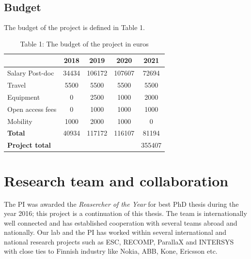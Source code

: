 \documentclass{article}
\begin{document}
\subsection{Budget}
The budget of the project is defined in Table 1.

\begin{table}
\vspace{-3.2cm}
\small
\begin{tabular}{ | l | c | c |c |c |}
\hline
& {\textbf{2018}} & {\textbf{2019}} & {\textbf{2020}} & {\textbf{2021}} \\ \hline
{Salary Post-doc} 	& 34434 & 106172 & 107607 & 72694 \\ \hline
{Travel} 			& 5500 	& 5500 	& 5500 	& 5500  \\ \hline
{Equipment} 		& 0 	& 2500 	& 1000 	& 2000  \\ \hline
{Open access fees} 	& 0 	& 1000 	& 1000 	& 1000  \\ \hline
{Mobility} 			& 1000 	& 2000 	& 1000 	& 0  \\ \hline
{\textbf{Total}} 	& 40934 & 117172	& 116107 	& 81194  \\ \hline
{\textbf{Project total}} 	&  & 	&  	& 355407  \\ \hline
\end{tabular}
\caption*{Table 1: The budget of the project in euros}
\label{tab:budget}
\vspace{-0.5cm}
\end{table}


\section{Research team and collaboration}
The PI was awarded the \textit{Reasercher of the Year} for best PhD thesis during the year 2016; this project is a continuation of this thesis.
The team is internationally well connected and has established cooperation with several teams abroad and nationally. 
Our lab and the PI has worked within several international and national research projects such as ESC, RECOMP, ParallaX and INTERSYS with close ties to Finnish industry like Nokia, ABB, Kone, Ericsson etc.
\end{document}
